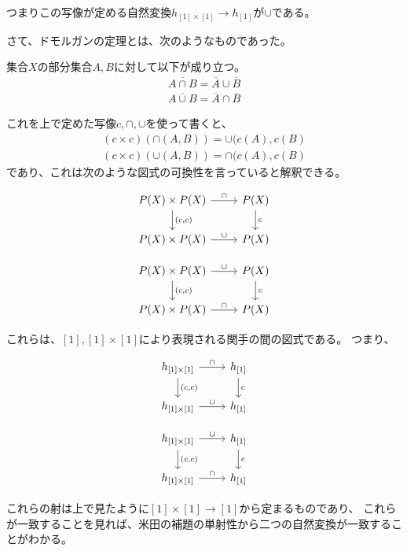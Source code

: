 \documentclass[uplatex]{jsarticle}
\begin{document}
つまりこの写像が定める自然変換$h_{[1]\times[1]} \to h_{[1]}$が$\cup$である。

\vspace{10pt}
さて、ドモルガンの定理とは、次のようなものであった。
\begin{thm}[ドモルガンの定理]
集合$X$の部分集合$A, B$に対して以下が成り立つ。
\begin{align*}
\overline{A\cap B}=\overline{A}\cup\overline{B}\\
\overline{A\cup B}=\overline{A}\cap\overline{B}
\end{align*}
\end{thm}
これを上で定めた写像$c, \cap, \cup$を使って書くと、
\begin{align*}
(c\times c)(\cap(A,B))=\cup(c(A),c(B)\\
(c\times c)(\cup(A,B))=\cap(c(A),c(B)
\end{align*}
であり、これは次のような図式の可換性を言っていると解釈できる。
\begin{multicols}{2}
\[
\begin{tikzcd}
P(X) \times P(X) \ar[r, "\cap"] \ar[d, "{(c, c)}"] & P(X) \ar[d, "c"]\\
P(X) \times P(X) \ar[r, "\cup"] & P(X)
\end{tikzcd}
\]

\[
\begin{tikzcd}
P(X) \times P(X) \ar[r, "\cup"] \ar[d, "{(c, c)}"] & P(X) \ar[d, "c"]\\
P(X) \times P(X) \ar[r, "\cap"] & P(X)
\end{tikzcd}
\]
\end{multicols}
これらは、$[1], [1] \times [1]$により表現される関手の間の図式である。
つまり、
\begin{multicols}{2}
\[
\begin{tikzcd}
h_{[1]\times[1]} \ar[r, "\cap"] \ar[d, "{(c, c)}"] & h_{[1]} \ar[d, "c"]\\
h_{[1]\times[1]} \ar[r, "\cup"] & h_{[1]}
\end{tikzcd}
\]

\[
\begin{tikzcd}
h_{[1]\times[1]} \ar[r, "\cup"] \ar[d, "{(c, c)}"] & h_{[1]} \ar[d, "c"]\\
h_{[1]\times[1]} \ar[r, "\cap"] & h_{[1]}
\end{tikzcd}
\]
\end{multicols}

これらの射は上で見たように$[1] \times [1] \to [1]$から定まるものであり、
これらが一致することを見れば、米田の補題の単射性から二つの自然変換が一致することがわかる。
\end{document}
